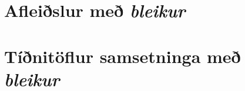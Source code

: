 \documentclass[12pt,b5paper,twosided,openany]{book}
\begin{document}
\section{Afleiðslur með \textit{bleikur}}
\label{afl:bleikafl}


\section{Tíðnitöflur samsetninga með \textit{bleikur}}
\label{tidni:bleiktid}



\printindex
\end{document}

